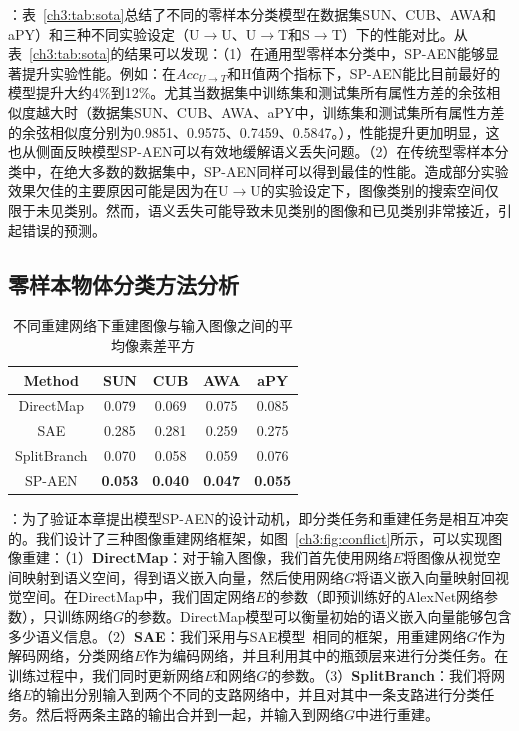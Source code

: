 \textbf{}：表~\ref{ch3:tab:sota}总结了不同的零样本分类模型在数据集SUN、CUB、AWA和aPY）和三种不同实验设定（U$\to$U、U$\to$T和S$\to$T）下的性能对比。从表~\ref{ch3:tab:sota}的结果可以发现：（1）在通用型零样本分类中，SP-AEN能够显著提升实验性能。例如：在$Acc_{U\to T}$和H值两个指标下，SP-AEN能比目前最好的模型提升大约4\%到12\%。尤其当数据集中训练集和测试集所有属性方差的余弦相似度越大时（数据集SUN、CUB、AWA、aPY中，训练集和测试集所有属性方差的余弦相似度分别为0.9851、0.9575、0.7459、0.5847。），性能提升更加明显，这也从侧面反映模型SP-AEN可以有效地缓解语义丢失问题。（2）在传统型零样本分类中，在绝大多数的数据集中，SP-AEN同样可以得到最佳的性能。造成部分实验效果欠佳的主要原因可能是因为在U$\to$U的实验设定下，图像类别的搜索空间仅限于未见类别。然而，语义丢失可能导致未见类别的图像和已见类别非常接近，引起错误的预测。

\subsection{零样本物体分类方法分析}

\begin{table}[t]
\centering
\begin{tabular}{|c | c| c| c| c|}
\hline
Method & \textbf{SUN} & \textbf{CUB} & \textbf{AWA} & \textbf{aPY} \\
\hline
 DirectMap & 0.079 & 0.069 & 0.075 & 0.085 \\
 SAE & 0.285 & 0.281 & 0.259 &  0.275\\
SplitBranch & 0.070 & 0.058  & 0.059 & 0.076 \\
SP-AEN & \textbf{0.053}  & \textbf{0.040}& \textbf{0.047} & \textbf{0.055} \\
\hline
\end{tabular}
\caption{不同重建网络下重建图像与输入图像之间的平均像素差平方}
\label{ch3:tab:conflict_quantitative}
\end{table}

\textbf{}：为了验证本章提出模型SP-AEN的设计动机，即分类任务和重建任务是相互冲突的。我们设计了三种图像重建网络框架，如图~\ref{ch3:fig:conflict}所示，可以实现图像重建：（1）\textbf{DirectMap}：对于输入图像，我们首先使用网络$E$将图像从视觉空间映射到语义空间，得到语义嵌入向量，然后使用网络$G$将语义嵌入向量映射回视觉空间。在DirectMap中，我们固定网络$E$的参数（即预训练好的AlexNet网络参数），只训练网络$G$的参数。DirectMap模型可以衡量初始的语义嵌入向量能够包含多少语义信息。（2）\textbf{SAE}：我们采用与SAE模型~\cite{kodirov2017semantic}相同的框架，用重建网络$G$作为解码网络，分类网络$E$作为编码网络，并且利用其中的瓶颈层来进行分类任务。在训练过程中，我们同时更新网络$E$和网络$G$的参数。（3）\textbf{SplitBranch}：我们将网络$E$的输出分别输入到两个不同的支路网络中，并且对其中一条支路进行分类任务。然后将两条主路的输出合并到一起，并输入到网络$G$中进行重建。

